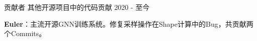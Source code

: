 \begin{cventries}
\vspace{-4mm}

\cventry
{贡献者} %
{其他开源项目中的代码贡献} %
{} %
{2020 - 至今} %
{ %
	\begin{cvitems}
		\item {\textbf{Euler}：主流开源GNN训练系统。修复采样操作在Shape计算中的Bug，共贡献两个Commits。}
	\end{cvitems}
}


\end{cventries}